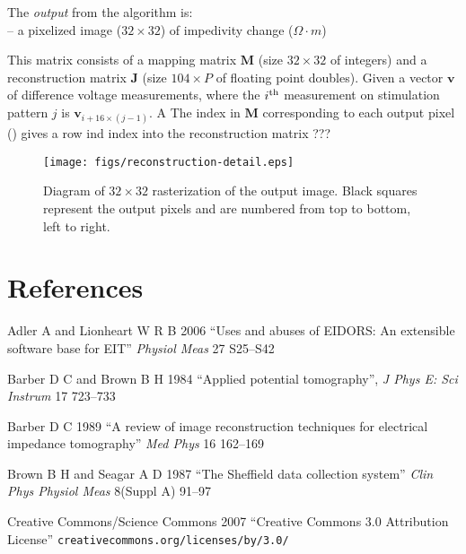 \documentclass[12pt]{iopart}
\newcommand{\vB}{\mbox{$\mathbf{v}$}}
\newcommand{\RB}{\mbox{$\mathbf{J}$}}
\newcommand{\MB}{\mbox{$\mathbf{M}$}}
\begin{document}
The {\em output} from the algorithm is:
\\
   -- a pixelized image ($32\times 32$) of 
      impedivity change ($\Omega \cdot m$)


      This matrix consists of a mapping matrix $\MB$ (size $32\times 32$ of
      integers) and a reconstruction matrix $\RB$ (size $104\times P$ of
      floating point doubles).
      Given a vector $\vB$ of difference voltage measurements, where
      the $i^{\rm th}$ measurement on stimulation pattern $j$ is
      $\vB_{i+16\times(j-1)}$. A 
      The index in $\MB$ corresponding to each output pixel
      () gives a row ind index into the
      reconstruction matrix 
???

\begin{figure}[bhtp]
\begin{center}
  \texttt{[image: figs/reconstruction-detail.eps]}

\caption{ \label{fig:reconst_detail}
Diagram of $32\times 32$ rasterization of the output image. Black
squares represent the output pixels and are numbered from top
to bottom, left to right.
}
\end{center}
\end{figure}



\section*{References}

\References %
\item[]
Adler A and Lionheart W R B 2006
``Uses and abuses of EIDORS: An extensible software base for EIT''
{\em Physiol Meas}
27 S25--S42

\item[]
Barber D C and Brown B H 1984
``Applied potential tomography'', 
{\em J Phys E: Sci Instrum}
 17 723--733

\item[]
Barber D C 1989
``A review of image reconstruction techniques for electrical
 impedance tomography''
{\em Med Phys}
16 162--169

\item[]
Brown B H and Seagar A D 1987 
``The Sheffield data collection system''
{\em Clin Phys Physiol Meas}
 8(Suppl A) 91--97

\item[]
Creative Commons/Science Commons 2007
``Creative Commons 3.0 Attribution License''
\verb+creativecommons.org/licenses/by/3.0/+
\end{document}
